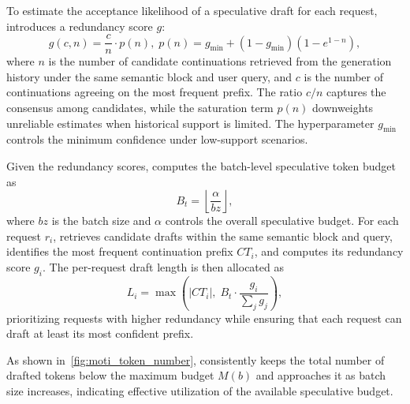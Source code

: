 To estimate the acceptance likelihood of a speculative draft for each request,
\sysname introduces a redundancy score $g$:
\begin{equation}
g(c,n) = \frac{c}{n}\cdot p(n), \;
p(n) = g_{\min} + (1-g_{\min})(1-e^{1-n}),
\end{equation}
where $n$ is the number of candidate continuations retrieved from the generation
history under the same semantic block and user query, and $c$ is the number of
continuations agreeing on the most frequent prefix. The ratio $c/n$ captures the
consensus among candidates, while the saturation term $p(n)$ downweights unreliable
estimates when historical support is limited. The hyperparameter $g_{\min}$ controls
the minimum confidence under low-support scenarios.

Given the redundancy scores, \sysname computes the batch-level speculative token
budget as
\begin{equation}
B_t = \left\lfloor \frac{\alpha}{bz} \right\rfloor,
\end{equation}
where $bz$ is the batch size and $\alpha$ controls the overall speculative budget.
For each request $r_i$, \sysname retrieves candidate drafts within the same semantic
block and query, identifies the most frequent continuation prefix $CT_i$, and
computes its redundancy score $g_i$. The per-request draft length is then allocated as
\begin{equation}
L_i = \max\!\left(|CT_i|,\; B_t \cdot \frac{g_i}{\sum_j g_j}\right),
\end{equation}
prioritizing requests with higher redundancy while ensuring that each request can
draft at least its most confident prefix.

As shown in~\cref{fig:moti_token_number}, \sysname consistently keeps the total number
of drafted tokens below the maximum budget $M(b)$ and approaches it as batch size
increases, indicating effective utilization of the available speculative budget.

